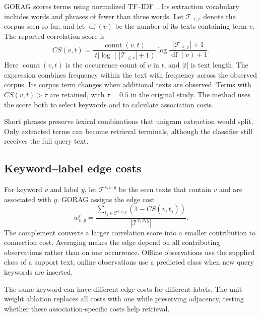 GORAG scores terms using normalized TF--IDF~\cite{gorag-tfidf}. Its extraction vocabulary includes words and phrases of fewer than three words. Let $\mathcal{T}_{\leq r}$ denote the corpus seen so far, and let $\operatorname{df}(v)$ be the number of its texts containing term $v$. The reported correlation score is
\begin{equation}
CS(v,t)=\frac{\operatorname{count}(v,t)}{|t|\log(|\mathcal{T}_{\leq r}|+1)}
\log\frac{|\mathcal{T}_{\leq r}|+1}{\operatorname{df}(v)+1}.
\label{eq:gorag:correlation}
\end{equation}
Here $\operatorname{count}(v,t)$ is the occurrence count of $v$ in $t$, and $|t|$ is text length. The expression combines frequency within the text with frequency across the observed corpus. Its corpus term changes when additional texts are observed. Terms with $CS(v,t)>\tau$ are retained, with $\tau=0.5$ in the original study. The method uses the score both to select keywords and to calculate association costs.

Short phrases preserve lexical combinations that unigram extraction would split. Only extracted terms can become retrieval terminals, although the classifier still receives the full query text.

\subsection{Keyword--label edge costs}
\label{sec:gorag:weights}

For keyword $v$ and label $y$, let $\mathcal{T}^{r,v,y}$ be the seen texts that contain $v$ and are associated with $y$. GORAG assigns the edge cost
\begin{equation}
w_{v,y}^r=\frac{\sum_{t_j\in\mathcal{T}^{r,v,y}}(1-CS(v,t_j))}{|\mathcal{T}^{r,v,y}|}.
\label{eq:gorag:weights}
\end{equation}
The complement converts a larger correlation score into a smaller contribution to connection cost. Averaging makes the edge depend on all contributing observations rather than on one occurrence. Offline observations use the supplied class of a support text; online observations use a predicted class when new query keywords are inserted.

The same keyword can have different edge costs for different labels. The unit-weight ablation replaces all costs with one while preserving adjacency, testing whether these association-specific costs help retrieval.

